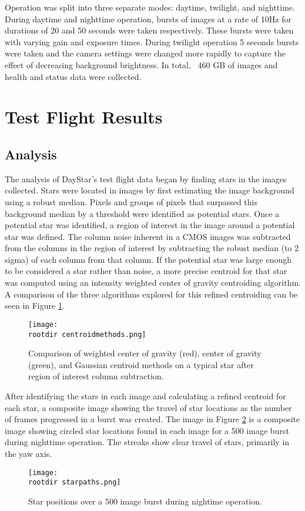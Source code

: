 \documentclass[twocolumn,letterpaper]{IEEEAerospace2012}
\newcommand{\rootdir}{./Figures/}
\begin{document}
Operation was split into three separate modes: daytime, twilight, and nighttime. During daytime and nighttime operation, bursts of images at a rate of 10Hz for durations of 20 and 50 seconds were taken respectively. These bursts were taken with varying gain and exposure times. During twilight operation 5 seconds bursts were taken and the camera settings were changed more rapidly to capture the effect of decreasing background brightness. In total, ~460 GB of images and health and status data were collected.

\section{Test Flight Results}

\subsection{Analysis}
The analysis of DayStar's test flight data began by finding stars in the images collected. Stars were located in images by first estimating the image background using a robust median. Pixels and groups of pixels that surpassed this background median by a threshold were identified as potential stars. Once a potential star was identified, a region of interest in the image around a potential star was defined. The column noise inherent in a CMOS images was subtracted from the columns in the region of interest by subtracting the robust median (to 2 sigma) of each column from that column. If the potential star was large enough to be considered a star rather than noise, a more precise centroid for that star was computed using an intensity weighted center of gravity centroiding algorithm. A comparison of the three algorithms explored for this refined centroiding can be seen in Figure \ref{fig:centroidmethods}. 
\begin{figure}[H]
    \centering
    \texttt{[image: \\rootdir centroidmethods.png]}
    \caption{Comparison of weighted center of gravity (red), center of gravity (green), and Gaussian centroid methods on a typical star after region of interest column subtraction.}
    \label{fig:centroidmethods}
\end{figure}

After identifying the stars in each image and calculating a refined centroid for each star, a composite image showing the travel of star locations as the number of frames progressed in a burst was created. The image in Figure \ref{fig:starpaths} is a composite image showing circled star locations found in each image for a 500 image burst during nighttime operation. The streaks show clear travel of stars, primarily in the yaw axis.
\begin{figure}[H]
    \centering
    \texttt{[image: \\rootdir starpaths.png]}
    \caption{Star positions over a 500 image burst during nightime operation.}
    \label{fig:starpaths}
\end{figure}
\end{document}
